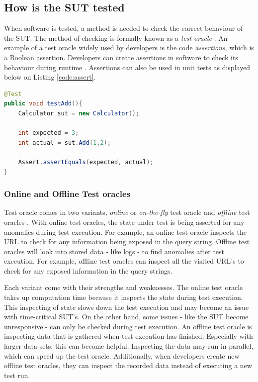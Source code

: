 \subsection{How is the SUT tested} \label{test-oracles}
When software is tested, a method is needed to check the correct behaviour of the SUT. The method of checking is formally known as a \emph{test oracle} \cite{testOracles}. An example of a test oracle widely used by developers is the code \emph{assertions}, which is a Boolean assertion. Developers can create assertions in software to check its behaviour during runtime \cite{barr2014oracle}. Assertions can also be used in unit tests as displayed below on Listing \ref{code:assert}. 

\begin{lstlisting}[language=Java, caption=Assertion, label=code:assert]
@Test
public void testAdd(){
    Calculator sut = new Calculator();

    int expected = 3;
    int actual = sut.Add(1,2);

    Assert.assertEquals(expected, actual);
}
\end{lstlisting}

\subsubsection{Online and Offline Test oracles}
Test oracle comes in two variants, \emph{online} or \emph{on-the-fly} test oracle and \emph{offline} test oracles \cite{VosAho2021}. With online test oracles, the state under test is being asserted for any anomalies during test execution. For example,  an online test oracle inspects the URL to check for any information being exposed in the query string. Offline test oracles will look into stored data - like logs - to find anomalies after test execution. For example, offline test oracles can inspect all the visited URL's to check for any exposed information in the query strings.

Each variant come with their strengths and weaknesses. The online test oracle takes up computation time because it inspects the state during test execution. This inspecting of state slows down the test execution and may become an issue with time-critical SUT's. On the other hand, some issues - like the SUT become unresponsive - can only be checked during test execution. An offline test oracle is inspecting data that is gathered when test execution has finished. Especially with larger data sets, this can become helpful. Inspecting the data may run in parallel, which can speed up the test oracle. Additionally, when developers create new offline test oracles, they can inspect the recorded data instead of executing a new test run. \cite{de2019offline}

